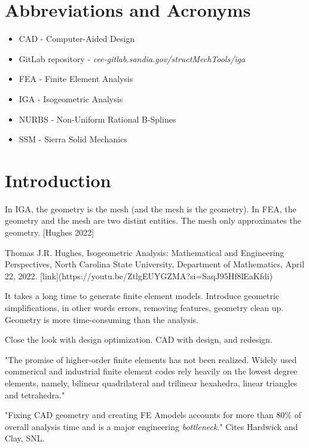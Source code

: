 \documentclass[12pt,report,justified]{SANDreport}
\begin{document}
\chapter*{Abbreviations and Acronyms}
\begin{itemize}
\item CAD - Computer-Aided Design
\item GitLab repository - {\em cee-gitlab.sandia.gov/structMechTools/iga}
\item FEA - Finite Element Analysis
\item IGA - Isogeometric Analysis
\item NURBS - Non-Uniform Rational B-Splines
\item SSM - Sierra Solid Mechanics
\end{itemize}

\chapter{Introduction}


In IGA, the geometry is the mesh (and the mesh is the geometry).  In FEA, the geometry and the mesh are two distint entities.  The mesh only approximates the geometry. [Hughes 2022]

Thomas J.R. Hughes, Isogeometric Analysis: Mathematical and Engineering Perspectives, North Carolina State University, Department of Mathematics, April 22, 2022.  
[link](https://youtu.be/ZtlgEUYGZMA?si=SaqJ95Hf8lEaKfdi)

It takes a long time to generate finite element models.
Introduce geometric simplifications, in other words errors, removing features, geometry clean up.  Geometry is more time-consuming than the analysis.

Close the look with design optimization.  CAD with design, and redesign.

"The promise of higher-order finite elements has not been realized.  Widely used commerical and industrial finite element codes rely heavily on the lowest degree elements, namely, bilinear quadrilateral and trilinear hexahedra, linear triangles and tetrahedra."

"Fixing CAD geometry and creating FE Amodels accounts for more than 80\% of overall analysis time and is a major engineering {\em bottleneck}." Cites Hardwick and Clay, SNL.
\end{document}
